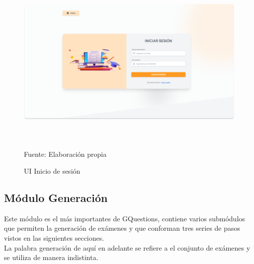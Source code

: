 \documentclass[../Main.tex]{subfiles}
\begin{document}
    \begin{figure}[H]
	\begin{Center}
		\includegraphics[width=6.4in,height=3.3in]{Images/ui_usuario_inicio_sesion.png}
	    \caption{UI Inicio de sesión}
	    Fuente: Elaboración propia
        \label{fig:section}
	\end{Center}
    \end{figure}
    
    
    \subsection{Módulo Generación}
    \begin{justify}
    Este módulo es el más importantes de GQuestions, contiene varios submódulos que permiten la generación de exámenes y que conforman tres series de pasos vistos en las siguientes secciones.\\
    La palabra generación de aquí en adelante se refiere a el conjunto de exámenes y se utiliza de manera indistinta.
    \end{justify}
    
\end{document}
